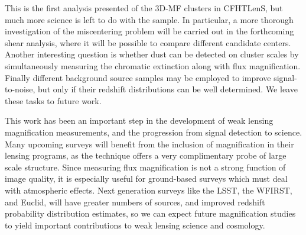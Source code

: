 This is the first analysis presented of the \ac{3D-MF} clusters in \ac{CFHTLenS}, but much more science is left to do with the sample. In particular, a more thorough investigation of the miscentering problem will be carried out in the forthcoming shear analysis, where it will be possible to compare different candidate centers. Another interesting question is whether dust can be detected on cluster scales by simultaneously measuring the chromatic extinction along with flux magnification. Finally different background source samples may be employed to improve signal-to-noise, but only if their redshift distributions can be well determined. We leave these tasks to future work.

This work has been an important step in the development of weak lensing magnification measurements, and the progression from signal detection to science. Many upcoming surveys will benefit from the inclusion of magnification in their lensing programs, as the technique offers a very complimentary probe of large scale structure. Since measuring flux magnification is not a strong function of image quality, it is especially useful for ground-based surveys which must deal with atmospheric effects. Next generation surveys like the \ac{LSST}, the \ac{WFIRST}, and \acs{Euclid}, will have greater numbers of sources, and improved redshift probability distribution estimates, so we can expect future magnification studies to yield important contributions to weak lensing science and cosmology.


